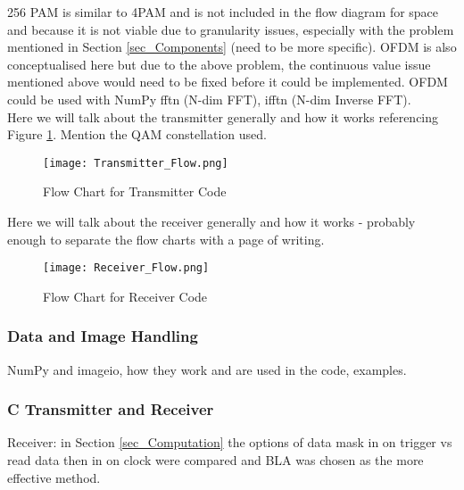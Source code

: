 \documentclass[../main.tex]{subfiles}
\begin{document}
256 PAM is similar to 4PAM and is not included in the flow diagram for space and because it is not viable due to granularity issues, especially with the problem mentioned in Section \ref{sec_Components} (need to be more specific).
OFDM is also conceptualised here but due to the above problem, the continuous value issue mentioned above would need to be fixed before it could be implemented.
OFDM could be used with NumPy fftn (N-dim FFT), ifftn (N-dim Inverse FFT).\\

Here we will talk about the transmitter generally and how it works referencing Figure \ref{fig_Transmitter_Flow}.
Mention the QAM constellation used.\\

\begin{figure}[ht]
	\centering
	\texttt{[image: Transmitter\_Flow.png]}
	\caption{Flow Chart for Transmitter Code}
	\label{fig_Transmitter_Flow}
\end{figure}

Here we will talk about the receiver generally and how it works - probably enough to separate the flow charts with a page of writing.\\

\begin{figure}[ht]
	\centering
	\texttt{[image: Receiver\_Flow.png]}
	\caption{Flow Chart for Receiver Code}
	\label{fig_Receiver_Flow}
\end{figure}

\subsubsection{Data and Image Handling}

NumPy and imageio, how they work and are used in the code, examples.\\

\subsubsection{C Transmitter and Receiver}

Receiver: in Section \ref{sec_Computation} the options of data mask in on trigger vs read data then in on clock were compared and BLA was chosen as the more effective method.
\end{document}
